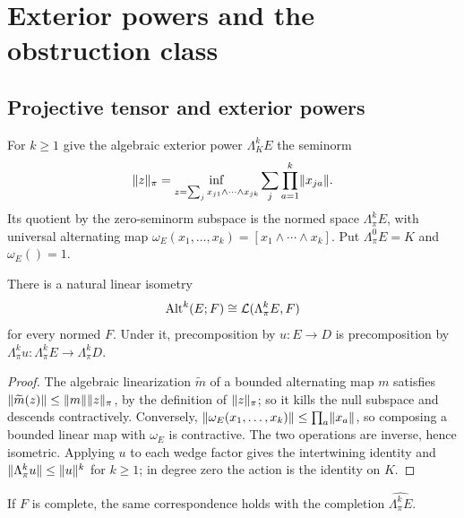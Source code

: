 \section{Exterior powers and the obstruction class}\label{sec:duality}

\subsection{Projective tensor and exterior powers}\label{ob:ssec:powers}

For $k\ge1$ give the algebraic exterior power $\Lambda^k_KE$ the seminorm
\[
 \lVert z\rVert_\pi=\inf_{z=\sum_jx_{j1}\wedge\cdots\wedge x_{jk}}
                 \sum_j\prod_{a=1}^k\lVert x_{ja}\rVert.
\]
Its quotient by the zero-seminorm subspace is the normed space $\Lambda^k_\pi E$, with universal alternating map
$\omega_E(x_1,\ldots,x_k)=[x_1\wedge\cdots\wedge x_k]$. Put $\Lambda^0_\pi E=K$ and $\omega_E()=1$.

\begin{proposition}[representation]\label{prop:exterior}
There is a natural linear isometry
\[
 \operatorname{Alt}^k(E;F)\cong\mathcal L(\Lambda^k_\pi E,F)
\]
for every normed $F$. Under it, precomposition by $u\colon E\to D$ is precomposition by
$\Lambda^k_\pi u\colon\Lambda^k_\pi E\to\Lambda^k_\pi D$.
\end{proposition}
\begin{proof}
The algebraic linearization $\widetilde m$ of a bounded alternating map $m$ satisfies
$\lVert \widetilde m(z)\rVert\le\lVert m\rVert\lVert z\rVert_\pi$, by the definition of $\lVert z\rVert_\pi$; so it kills the null subspace and
descends contractively. Conversely, $\lVert \omega_E(x_1,\ldots,x_k)\rVert\le\prod_a\lVert x_a\rVert$, so composing a bounded linear
map with $\omega_E$ is contractive. The two operations are inverse, hence isometric. Applying $u$ to each
wedge factor gives the intertwining identity and $\lVert \Lambda^k_\pi u\rVert\le\lVert u\rVert^k$ for $k\ge1$; in degree zero the
action is the identity on $K$.
\end{proof}

If $F$ is complete, the same correspondence holds with the completion $\widehat{\Lambda^k_\pi E}$.

